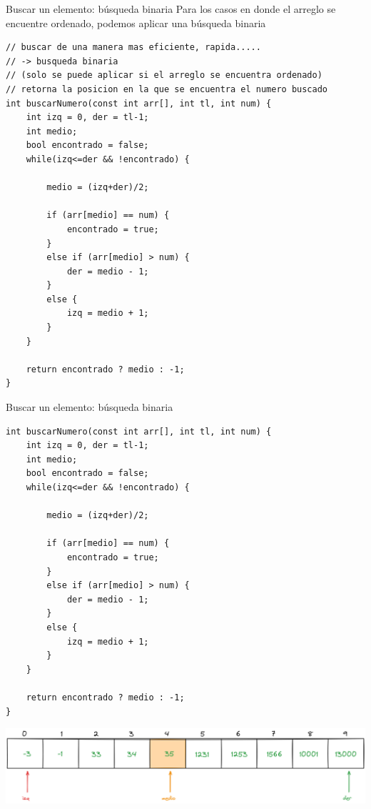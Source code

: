 \documentclass[12pt]{beamer}
\begin{document}
\begin{frame}[fragile]{Buscar un elemento: búsqueda binaria}
    Para los casos en donde el arreglo se encuentre \alert{ordenado}, podemos aplicar una búsqueda binaria
\begin{lstlisting}[basicstyle=\tiny]
// buscar de una manera mas eficiente, rapida.....
// -> busqueda binaria
// (solo se puede aplicar si el arreglo se encuentra ordenado)
// retorna la posicion en la que se encuentra el numero buscado
int buscarNumero(const int arr[], int tl, int num) {
	int izq = 0, der = tl-1;
	int medio;
	bool encontrado = false;
	while(izq<=der && !encontrado) {
		
		medio = (izq+der)/2;
		
		if (arr[medio] == num) {
			encontrado = true;
		}
		else if (arr[medio] > num) {
			der = medio - 1;
		}
		else {
			izq = medio + 1;
		}
	}
	
	return encontrado ? medio : -1;
}
\end{lstlisting}
\end{frame}

\begin{frame}[fragile]{Buscar un elemento: búsqueda binaria}
\begin{lstlisting}[basicstyle=\tiny]
int buscarNumero(const int arr[], int tl, int num) {
    int izq = 0, der = tl-1;
    int medio;
    bool encontrado = false;
    while(izq<=der && !encontrado) {
        
        medio = (izq+der)/2;
        
        if (arr[medio] == num) {
            encontrado = true;
        }
        else if (arr[medio] > num) {
            der = medio - 1;
        }
        else {
            izq = medio + 1;
        }
    }
    
    return encontrado ? medio : -1;
}
\end{lstlisting}
    \includegraphics[width=\textwidth]{busqueda_binaria_1.png}
\end{frame}
\end{document}
